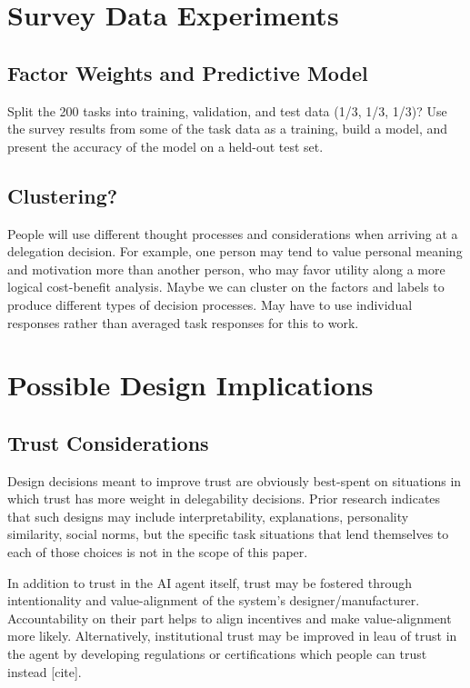 \documentclass[letterpaper]{article} %
\begin{document}
\section{Survey Data Experiments}

\subsection{Factor Weights and Predictive Model}
Split the 200 tasks into training, validation, and test data (1/3, 1/3, 1/3)? Use the survey results from some of the task data as a training, build a model, and present the accuracy of the model on a held-out test set.

\subsection{Clustering?}
People will use different thought processes and considerations when arriving at a delegation decision. For example, one person may tend to value personal meaning and motivation more than another person, who may favor utility along a more logical cost-benefit analysis. Maybe we can cluster on the factors and labels to produce different types of decision processes. May have to use individual responses rather than averaged task responses for this to work. 

\section{Possible Design Implications}

\subsection{Trust Considerations}
Design decisions meant to improve trust are obviously best-spent on situations in which trust has more weight in delegability decisions. Prior research indicates that such designs may include interpretability, explanations, personality similarity, social norms, but the specific task situations that lend themselves to each of those choices is not in the scope of this paper.

In addition to trust in the AI agent itself, trust may be fostered through intentionality and value-alignment of the system's designer/manufacturer. Accountability on their part helps to align incentives and make value-alignment more likely. Alternatively, institutional trust may be improved in leau of trust in the agent by developing regulations or certifications which people can trust instead [cite].
\end{document}
